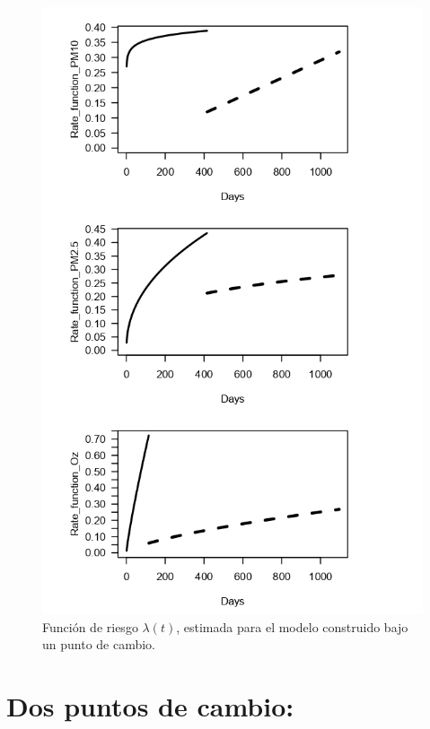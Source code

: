\begin{figure}[hbt!]
\begin{center}
\includegraphics[width=13cm]{RIESGOUPC}
\end{center}
\centering
\caption{ Función de riesgo $\lambda (t)$, estimada para el modelo construido bajo un punto de cambio.   }
\label{rate_upc}
\end{figure}

\newpage
\section{Dos puntos de cambio:}

